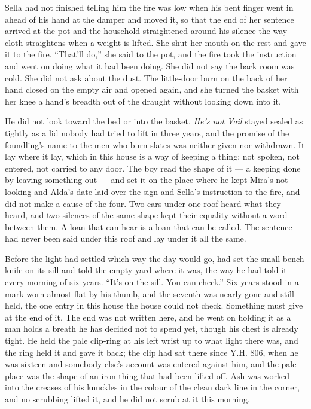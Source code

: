 Sella had not finished telling him the fire was low when his bent finger went in ahead of his hand at the damper and moved it, so that the end of her sentence arrived at the pot and the household straightened around his silence the way cloth straightens when a weight is lifted. She shut her mouth on the rest and gave it to the fire. “That'll do,” she said to the pot, and the fire took the instruction and went on doing what it had been doing. She did not say the back room was cold. She did not ask about the dust. The little-door burn on the back of her hand closed on the empty air and opened again, and she turned the basket with her knee a hand's breadth out of the draught without looking down into it.

He did not look toward the bed or into the basket. \emph{He's not Vail} stayed sealed as tightly as a lid nobody had tried to lift in three years, and the promise of the foundling's name to the men who burn slates was neither given nor withdrawn. It lay where it lay, which in this house is a way of keeping a thing: not spoken, not entered, not carried to any door. The boy read the shape of it --- a keeping done by leaving something out --- and set it on the place where he kept Mira's not-looking and Alda's date laid over the sign and Sella's instruction to the fire, and did not make a cause of the four. Two ears under one roof heard what they heard, and two silences of the same shape kept their equality without a word between them. A loan that can hear is a loan that can be called. The sentence had never been said under this roof and lay under it all the same.

\scenebreak

Before the light had settled which way the day would go,  had set the small bench knife on its sill and told the empty yard where it was, the way he had told it every morning of six years. “It's on the sill. You can check.” Six years stood in a mark worn almost flat by his thumb, and the seventh was nearly gone and still held, the one entry in this house the house could not check. Something must give at the end of it. The end was not written here, and he went on holding it as a man holds a breath he has decided not to spend yet, though his chest is already tight. He held the pale clip-ring at his left wrist up to what light there was, and the ring held it and gave it back; the clip had sat there since Y.H. 806, when he was sixteen and somebody else's account was entered against him, and the pale place was the shape of an iron thing that had been lifted off. Ash was worked into the creases of his knuckles in the colour of the clean dark line in the corner, and no scrubbing lifted it, and he did not scrub at it this morning.

